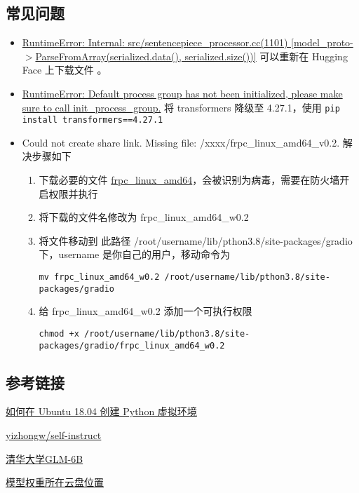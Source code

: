 \documentclass{article}
\begin{document}
\subsection{常见问题\label{question}}
\begin{itemize}
    \item \href{https://github.com/THUDM/ChatGLM2-6B/issues/21}{RuntimeError: Internal: src/sentencepiece\_processor.cc(1101) [model\_proto-$>$ParseFromArray(serialized.data(), serialized.size())]} 可以重新在 Hugging Face 上下载文件 。
    \item \href{https://github.com/THUDM/ChatGLM2-6B/issues/208}{RuntimeError: Default process group has not been initialized, please make sure to call init\_process\_group.} 将 transformers 降级至 4.27.1，使用 \verb|pip install transformers==4.27.1|
    \item Could not create share link. Missing file: /xxxx/frpc\_linux\_amd64\_v0.2. 解决步骤如下
          \begin{enumerate}
              \item 下载必要的文件 \href{https://cdn-media.huggingface.co/frpc-gradio-0.2/frpc_linux_amd64}{frpc\_linux\_amd64}，会被识别为病毒，需要在防火墙开启权限并执行
              \item 将下载的文件名修改为 frpc\_linux\_amd64\_w0.2
              \item 将文件移动到 此路径 /root/username/lib/pthon3.8/site-packages/gradio 下，username 是你自己的用户，移动命令为

                    \verb|mv frpc_linux_amd64_w0.2 /root/username/lib/pthon3.8/site-packages/gradio|
              \item 给 frpc\_linux\_amd64\_w0.2 添加一个可执行权限

                    \verb|chmod +x /root/username/lib/pthon3.8/site-packages/gradio/frpc_linux_amd64_w0.2|
          \end{enumerate}
\end{itemize}
\subsection{参考链接}
\href{https://www.myfreax.com/how-to-create-python-virtual-environments-on-ubuntu-18-04/}{如何在 Ubuntu 18.04 创建 Python 虚拟环境}

\href{https://github.com/yizhongw/self-instruct/blob/main/human_eval/README.md}{yizhongw/self-instruct}

\href{https://github.com/THUDM/ChatGLM-6B}{清华大学GLM-6B}

\href{https://cloud.tsinghua.edu.cn/d/fb9f16d6dc8f482596c2/}{模型权重所在云盘位置}
\end{document}
